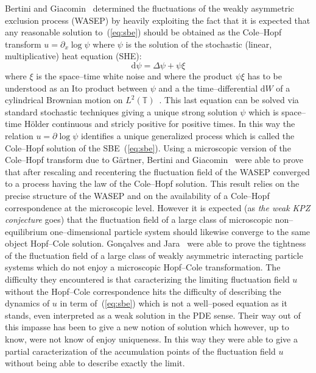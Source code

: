 \documentclass[a4paper,11pt]{article}
\newcommand{\mathd}{\mathrm{d}}
\newcommand{\tmem}[1]{{\em #1\/}}
\begin{document}
Bertini and Giacomin~{\cite{BertiniGiacomin1997}} determined the fluctuations
of the weakly asymmetric exclusion process (WASEP) by heavily exploiting the
fact that it is expected that any reasonable solution to~(\ref{eq:sbe}) should
be obtained as the Cole--Hopf transform $u = \partial_x \log \psi$ where
$\psi$ is the solution of the stochastic (linear, multiplicative) heat
equation (SHE):
\begin{equation}
  \mathd \psi = \Delta \psi + \psi \xi \label{eq:she}
\end{equation}
where $\xi$ is the space--time white noise and where the product $\psi \xi$
has to be understood as an Ito product between $\psi$ and a the
time--differential $\mathd W$ of a cylindrical Brownian motion on $L^2
(\mathbb{T})$~{\cite{prato_stochastic_2008}}. This last equation can be
solved via standard stochastic techniques giving a unique strong solution
$\psi$ which is space--time H{\"o}lder continuous and stricly positive for
positive times. In this way the relation $u = \partial \log \psi$ identifies a
unique generalized process which is called the Cole--Hopf solution of the
SBE~(\ref{eq:sbe}). Using a microscopic version of the Cole--Hopf transform
due to G{\"a}rtner, Bertini and Giacomin~{\cite{BertiniGiacomin1997}} were
able to prove that after rescaling and recentering the fluctuation field of
the WASEP converged to a process having the law of the Cole--Hopf solution.
This result relies on the precise structure of the WASEP and on the
availability of a Cole--Hopf correspondence at the microscopic level. However
it is expected (as {\tmem{the weak KPZ conjecture}} goes) that the fluctuation
field of a large class of microscopic non--equilibrium one--dimensional
particle system should likewise converge to the same object Hopf--Cole
solution. Gon{\c c}alves and Jara~{\cite{goncalves_nonlinear_2013}} were able
to prove the tightness of the fluctuation field of a large class of weakly
asymmetric interacting particle systems which do not enjoy a microscopic
Hopf--Cole transformation. The difficulty they encountered is that
caracterizing the limiting fluctuation field $u$ without the Hopf--Cole
correspondence hits the difficulty of describing the dynamics of $u$ in term
of~(\ref{eq:sbe}) which is not a well--posed equation as it stands, even
interpreted as a weak solution in the PDE sense. Their way out of this impasse
has been to give a new notion of solution which however, up to know, were not
know of enjoy uniqueness. In this way they were able to give a partial
caracterization of the accumulation points of the fluctuation field $u$
without being able to describe exactly the limit.
\end{document}
